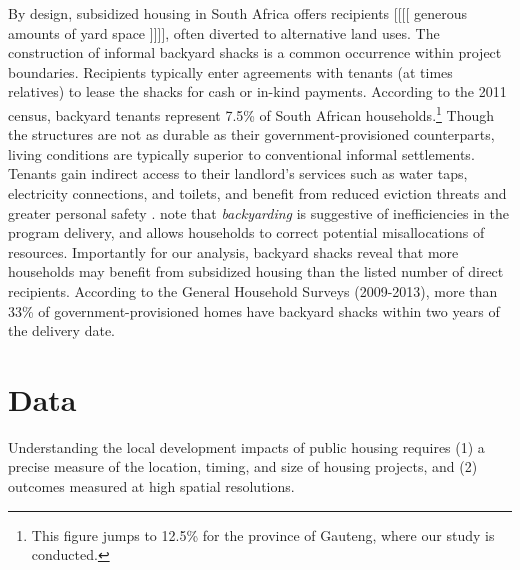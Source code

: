 \documentclass[12pt]{article}
\begin{document}
By design, subsidized housing in South Africa offers recipients [[[[ generous amounts of yard space ]]]], often diverted to alternative land uses. The construction of informal backyard shacks is a common occurrence within project boundaries. Recipients typically enter agreements with tenants (at times relatives) to lease the shacks for cash or in-kind payments. According to the 2011 census, backyard tenants represent 7.5\% of South African households.\footnote{This figure jumps to 12.5\% for the province of Gauteng, where our study is conducted.} Though the structures are not as durable as their government-provisioned counterparts, living conditions are typically superior to conventional informal settlements. Tenants gain indirect access to their landlord's services such as water taps, electricity connections, and toilets, and benefit from reduced eviction threats and greater personal safety \citep{beall2003social}. \cite{Brueckner2018backyarding} note that {\it backyarding} is suggestive of inefficiencies in the program delivery, and allows households to correct potential misallocations of resources. Importantly for our analysis, backyard shacks reveal that more households may benefit from subsidized housing than the listed number of direct recipients. According to the General Household Surveys (2009-2013), more than 33\% of government-provisioned homes have backyard shacks within two years of the delivery date. 






\section{Data}\label{section:data}


Understanding the local development impacts of public housing requires (1) a precise measure of the location, timing, and size of housing projects, and (2) outcomes measured at high spatial resolutions.
\end{document}
